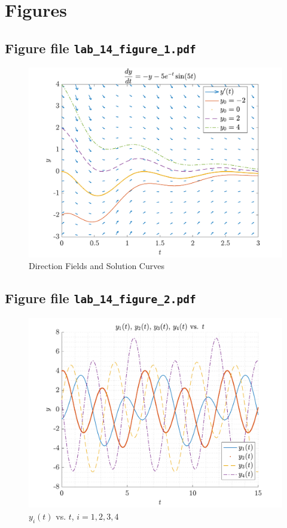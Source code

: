 \section{Figures}
\subsection{Figure file \lstinline[style=Plain]{lab_14_figure_1.pdf}}
\begin{figure}[!hbtp]
    \centering
    \includegraphics[height=0.38\textheight]{../src/lab_14_figure_1.pdf}
    \caption{Direction Fields and Solution Curves}
    \label{fig:my_label}
\end{figure}

\newpage
\subsection{Figure file \lstinline[style=Plain]{lab_14_figure_2.pdf}}
\begin{figure}[!hbtp]
    \centering
    \includegraphics[height=0.38\textheight]{../src/lab_14_figure_2.pdf}
    \caption{$y_{i}(t)$ vs. $t$, $i = 1, 2, 3, 4$}
    \label{fig:my_label}
\end{figure}

